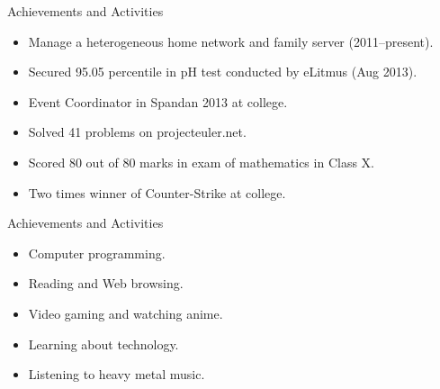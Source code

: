 \documentclass[11pt,oneside]{article}
\newenvironment{ressection}[1]{
  \vspace{4pt}
	     {\fontfamily{phv}\selectfont\Large#1}
	     \begin{itemize}
	       \vspace{3pt}
}{
	     \end{itemize}
}
\newcommand{\resitem}[1]{
  \vspace{-4pt}
\item \begin{flushleft} #1 \end{flushleft}
}
\begin{document}
\begin{ressection}{Achievements and Activities}
  \resitem{Manage a heterogeneous home network and family server (2011--present).}
  \resitem{Secured 95.05 percentile in pH test conducted by eLitmus (Aug 2013).}
  \resitem{Event Coordinator in Spandan 2013 at college.}
  \resitem{Solved 41 problems on projecteuler.net.}
  \resitem{Scored 80 out of 80 marks in exam of mathematics in Class X.}
  \resitem{Two times winner of Counter-Strike at college.}
\end{ressection}

\begin{ressection}{Achievements and Activities}
  \resitem{Computer programming.}
  \resitem{Reading and Web browsing.}
  \resitem{Video gaming and watching anime.}
  \resitem{Learning about technology.}
  \resitem{Listening to heavy metal music.}
\end{ressection}
\end{document}
